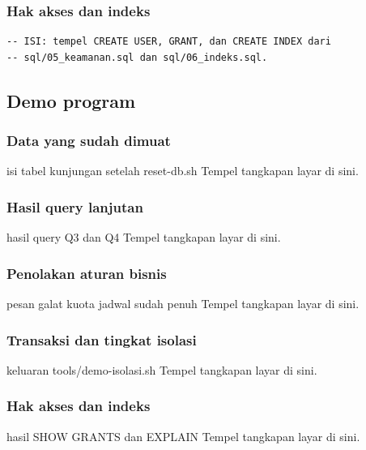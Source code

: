 \documentclass[12pt,a4paper]{article}
\begin{document}
\subsubsection{Hak akses dan indeks}
\begin{lstlisting}
-- ISI: tempel CREATE USER, GRANT, dan CREATE INDEX dari
-- sql/05_keamanan.sql dan sql/06_indeks.sql.
\end{lstlisting}

\subsection{Demo program}

\subsubsection{Data yang sudah dimuat}
\begin{tangkapanlayar}{isi tabel kunjungan setelah reset-db.sh}
  Tempel tangkapan layar di sini.
\end{tangkapanlayar}

\subsubsection{Hasil query lanjutan}
\begin{tangkapanlayar}{hasil query Q3 dan Q4}
  Tempel tangkapan layar di sini.
\end{tangkapanlayar}

\subsubsection{Penolakan aturan bisnis}
\begin{tangkapanlayar}{pesan galat kuota jadwal sudah penuh}
  Tempel tangkapan layar di sini.
\end{tangkapanlayar}

\subsubsection{Transaksi dan tingkat isolasi}
\begin{tangkapanlayar}{keluaran tools/demo-isolasi.sh}
  Tempel tangkapan layar di sini.
\end{tangkapanlayar}

\subsubsection{Hak akses dan indeks}
\begin{tangkapanlayar}{hasil SHOW GRANTS dan EXPLAIN}
  Tempel tangkapan layar di sini.
\end{tangkapanlayar}
\end{document}

